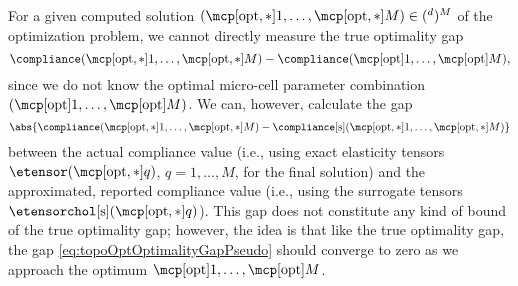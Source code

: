For a given computed solution
$(\mcpoptappr{1}, \dotsc, \mcpoptappr{M}) \in (\real^d)^M$
of the optimization problem,
we cannot directly measure the true optimality gap
\begin{equation}
  \label{eq:topoOptOptimalityGapTrue}
  \compliance(\mcpoptappr{1}, \dotsc, \mcpoptappr{M}) -
  \compliance(\mcpopt{1}, \dotsc, \mcpopt{M}),
\end{equation}
since we do not know the optimal micro-cell parameter combination
$(\mcpopt{1}, \dotsc, \mcpopt{M})$.
We can, however, calculate the gap
\begin{equation}
  \label{eq:topoOptOptimalityGapPseudo}
  \abs{
    \compliance(\mcpoptappr{1}, \dotsc, \mcpoptappr{M}) -
    \complianceintp(\mcpoptappr{1}, \dotsc, \mcpoptappr{M})
  }
\end{equation}
between the actual compliance value
(i.e., using exact elasticity tensors $\etensor(\mcpoptappr{q})$,
$q = 1, \dotsc, M$, for the final solution) and
the approximated, reported compliance value
(i.e., using the surrogate tensors $\etensorcholintp(\mcpoptappr{q})$).
This gap does not constitute any kind of bound of the true optimality gap;
however, the idea is that like the true optimality gap,
the gap \eqref{eq:topoOptOptimalityGapPseudo} should converge to zero as
we approach the optimum $\mcpopt{1}, \dotsc, \mcpopt{M}$.

\dummytext[3]{}
